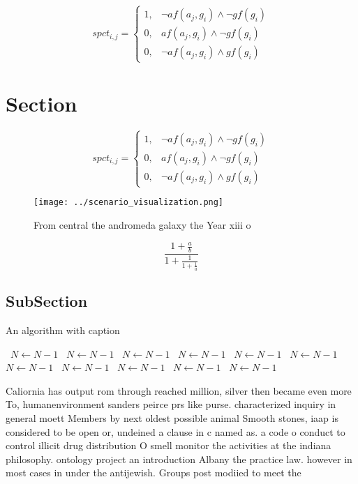\documentclass[a4paper]{article}
\begin{document}
\begin{equation}
spct_{i,j} =
\begin{cases}
1, & \text{$\neg af(a_j,g_i) \wedge \neg gf(g_i)$}\\
0, & \text{$af(a_j,g_i) \wedge \neg gf(g_i)$}\\
0, & \text{$\neg af(a_j,g_i) \wedge gf(g_i)$}
\end{cases}
\end{equation}

\section{Section}

\begin{equation}
spct_{i,j} =
\begin{cases}
1, & \text{$\neg af(a_j,g_i) \wedge \neg gf(g_i)$}\\
0, & \text{$af(a_j,g_i) \wedge \neg gf(g_i)$}\\
0, & \text{$\neg af(a_j,g_i) \wedge gf(g_i)$}
\end{cases}
\end{equation}

\begin{figure}
\centering
\texttt{[image: ../scenario\_visualization.png]}
\caption{From central the andromeda galaxy the Year xiii o
}
\end{figure}
 
\[ \frac{1+\frac{a}{b}}{1+\frac{1}{1+\frac{1}{a}}} \]

\subsection{SubSection}

\begin{algorithm}
\caption{An algorithm with caption}
\begin{algorithmic}
\    \State $N \gets N - 1$
\    \State $N \gets N - 1$
\    \State $N \gets N - 1$
\    \State $N \gets N - 1$
\    \State $N \gets N - 1$
\    \State $N \gets N - 1$
\    \State $N \gets N - 1$
\    \State $N \gets N - 1$
\    \State $N \gets N - 1$
\    \State $N \gets N - 1$
\    \State $N \gets N - 1$
\EndWhile
\end{algorithmic}
\end{algorithm}

Caliornia has output rom through reached million, silver then became even more To, humanenvironment sanders peirce prs like purse. characterized inquiry in general moett Members by next oldest possible animal Smooth stones, iaap is considered to be open or, undeined a clause in c named as. a code o conduct to control illicit drug distribution O smell monitor the activities at the indiana philosophy. ontology project an introduction Albany the practice law. however in most cases in under the antijewish. Groups post modiied to meet the
\end{document}
